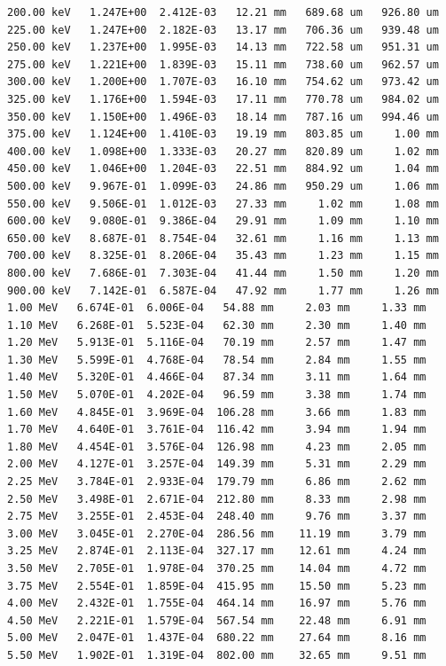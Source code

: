 \documentclass [11pt,a4paper,dvipdfmx] {jarticle}
\begin{document}
\begin{lstlisting}[caption={SRIMの出力ファイルの例。},basicstyle=\fontsize{6}{6}\ttfamily,identifierstyle=\fontsize{6}{6},numberstyle={\tiny},columns=fixed]
200.00 keV   1.247E+00  2.412E-03   12.21 mm   689.68 um   926.80 um  
225.00 keV   1.247E+00  2.182E-03   13.17 mm   706.36 um   939.48 um  
250.00 keV   1.237E+00  1.995E-03   14.13 mm   722.58 um   951.31 um  
275.00 keV   1.221E+00  1.839E-03   15.11 mm   738.60 um   962.57 um  
300.00 keV   1.200E+00  1.707E-03   16.10 mm   754.62 um   973.42 um  
325.00 keV   1.176E+00  1.594E-03   17.11 mm   770.78 um   984.02 um  
350.00 keV   1.150E+00  1.496E-03   18.14 mm   787.16 um   994.46 um  
375.00 keV   1.124E+00  1.410E-03   19.19 mm   803.85 um     1.00 mm  
400.00 keV   1.098E+00  1.333E-03   20.27 mm   820.89 um     1.02 mm  
450.00 keV   1.046E+00  1.204E-03   22.51 mm   884.92 um     1.04 mm  
500.00 keV   9.967E-01  1.099E-03   24.86 mm   950.29 um     1.06 mm  
550.00 keV   9.506E-01  1.012E-03   27.33 mm     1.02 mm     1.08 mm  
600.00 keV   9.080E-01  9.386E-04   29.91 mm     1.09 mm     1.10 mm  
650.00 keV   8.687E-01  8.754E-04   32.61 mm     1.16 mm     1.13 mm  
700.00 keV   8.325E-01  8.206E-04   35.43 mm     1.23 mm     1.15 mm  
800.00 keV   7.686E-01  7.303E-04   41.44 mm     1.50 mm     1.20 mm  
900.00 keV   7.142E-01  6.587E-04   47.92 mm     1.77 mm     1.26 mm  
1.00 MeV   6.674E-01  6.006E-04   54.88 mm     2.03 mm     1.33 mm  
1.10 MeV   6.268E-01  5.523E-04   62.30 mm     2.30 mm     1.40 mm  
1.20 MeV   5.913E-01  5.116E-04   70.19 mm     2.57 mm     1.47 mm  
1.30 MeV   5.599E-01  4.768E-04   78.54 mm     2.84 mm     1.55 mm  
1.40 MeV   5.320E-01  4.466E-04   87.34 mm     3.11 mm     1.64 mm  
1.50 MeV   5.070E-01  4.202E-04   96.59 mm     3.38 mm     1.74 mm  
1.60 MeV   4.845E-01  3.969E-04  106.28 mm     3.66 mm     1.83 mm  
1.70 MeV   4.640E-01  3.761E-04  116.42 mm     3.94 mm     1.94 mm  
1.80 MeV   4.454E-01  3.576E-04  126.98 mm     4.23 mm     2.05 mm  
2.00 MeV   4.127E-01  3.257E-04  149.39 mm     5.31 mm     2.29 mm  
2.25 MeV   3.784E-01  2.933E-04  179.79 mm     6.86 mm     2.62 mm  
2.50 MeV   3.498E-01  2.671E-04  212.80 mm     8.33 mm     2.98 mm  
2.75 MeV   3.255E-01  2.453E-04  248.40 mm     9.76 mm     3.37 mm  
3.00 MeV   3.045E-01  2.270E-04  286.56 mm    11.19 mm     3.79 mm  
3.25 MeV   2.874E-01  2.113E-04  327.17 mm    12.61 mm     4.24 mm  
3.50 MeV   2.705E-01  1.978E-04  370.25 mm    14.04 mm     4.72 mm  
3.75 MeV   2.554E-01  1.859E-04  415.95 mm    15.50 mm     5.23 mm  
4.00 MeV   2.432E-01  1.755E-04  464.14 mm    16.97 mm     5.76 mm  
4.50 MeV   2.221E-01  1.579E-04  567.54 mm    22.48 mm     6.91 mm  
5.00 MeV   2.047E-01  1.437E-04  680.22 mm    27.64 mm     8.16 mm  
5.50 MeV   1.902E-01  1.319E-04  802.00 mm    32.65 mm     9.51 mm  

\end{lstlisting}
\end{document}
